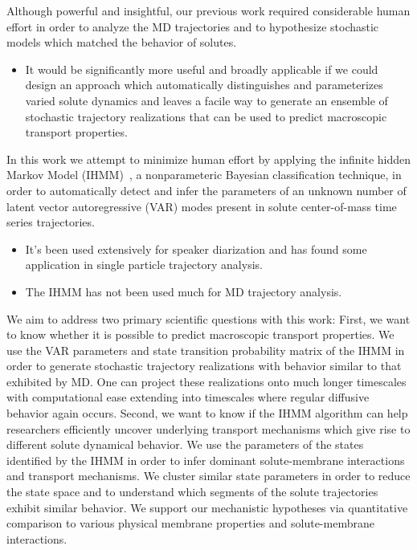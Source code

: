 \documentclass[journal=jpcbfk,manuscript=article]{achemso}
\begin{document}
  Although powerful and insightful, our previous work required considerable human effort
  in order to analyze the MD trajectories and to hypothesize stochastic models which
  matched the behavior of solutes.
  \begin{itemize}
    \item It would be significantly more useful and broadly applicable if we could 
    design an approach which automatically distinguishes and parameterizes varied solute 
    dynamics and leaves a facile way to generate an ensemble of stochastic trajectory
    realizations that can be used to predict macroscopic transport properties.
  \end{itemize}
  
  In this work we attempt to minimize human effort by applying the infinite hidden 
  Markov Model (IHMM)~\cite{beal_infinite_2002,calderon_inferring_2015}, a nonparameteric 
  Bayesian classification technique, in order to automatically detect and infer the 
  parameters of an unknown number of latent vector autoregressive (VAR) modes present 
  in solute center-of-mass time series trajectories. 
  \begin{itemize}
    \item It's been used extensively for speaker diarization and has found some application
    in single particle trajectory analysis.~\cite{calderon_inferring_2015,fox_sticky_2011}
    \item The IHMM has not been used much for MD trajectory analysis.

  \end{itemize}
  
  We aim to address two primary scientific questions with this work:
  First, we want to know whether it is possible to predict macroscopic transport
  properties. We use the VAR parameters and state transition probability matrix of
  the IHMM in order to generate stochastic trajectory realizations with behavior 
  similar to that exhibited by MD. One can project these realizations onto much 
  longer timescales with computational ease extending into timescales where 
  regular diffusive behavior again occurs.
  Second, we want to know if the IHMM algorithm can help researchers
  efficiently uncover underlying transport mechanisms which give rise to different 
  solute dynamical behavior.
  We use the parameters of the states identified by the IHMM in order to infer 
  dominant solute-membrane interactions and transport mechanisms. We cluster similar 
  state parameters in order to reduce the state space and to understand which segments 
  of the solute trajectories exhibit similar behavior. We support our mechanistic 
  hypotheses via quantitative comparison to various physical membrane properties and
  solute-membrane interactions.
  
\end{document}
